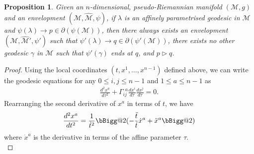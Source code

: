 \documentclass[pdflatex,sn-mathphys-num]{sn-jnl}
\makeatletter
\newtheorem{prop}[theorem]{Proposition}
\newcommand{\vast}{\bBigg@{2}}
\theoremstyle{definition}
\makeatother
\begin{document}
\begin{prop}\label{prop:3}
   Given an $n$-dimensional, pseudo-Riemannian manifold $(\mathcal{M},g)$ and an envelopment $(\mathcal{M},\hat{\mathcal{M}},\psi)$, if $\lambda$ is an affinely parametrised geodesic in $\mathcal{M}$ and $\psi(\lambda) \rightarrow p \in \partial(\psi(\mathcal{M}))$, then there always exists an envelopment $(\mathcal{M},\hat{\mathcal{M}}',\psi')$ such that $\psi'(\lambda) \rightarrow q \in \partial(\psi'(\mathcal{M}))$, there exists no other geodesic $\gamma$ in $\mathcal{M}$ such that $\psi'(\gamma) $ ends at $ q $, and $p \vartriangleright q$. 
\end{prop}

\begin{proof}

Using the local coordinates $(t,x^1,\dots,x^{n-1})$ defined above, we can write the geodesic equations for any $0 \leq i,j \leq n-1$ and $1 \leq a \leq n-1$ as 
\begin{align}
    \frac{d^2 x^a}{d\tau^2} + \Gamma^{~~a}_{ij}\frac{dx^i}{d\tau}\frac{d x^j}{d\tau} = 0 . \label{eq:40}
\end{align}
Rearranging the second derivative of $x^a$ in terms of $t$, we have
\begin{align}
    \frac{d^2 x^a}{dt^2} = \frac{1}{\dot{t}^2}\vast(-\frac{\ddot{t}}{\dot{t}}\dot{x}^a + \ddot{x}^a\vast) \label{eq:42}
\end{align}
where $\dot{x}^a$ is the derivative in terms of the affine parameter $\tau$. \\


\end{proof}
\end{document}
